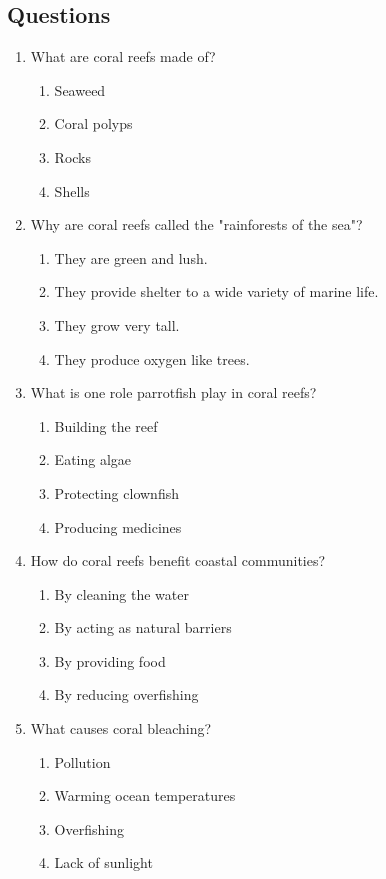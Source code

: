 \documentclass[12pt]{article}
\begin{document}
\subsection*{Questions}

\begin{enumerate}

\item What are coral reefs made of?
\begin{enumerate}[label=\Alph*.]
    \item Seaweed
    \item Coral polyps
    \item Rocks
    \item Shells
\end{enumerate}

\item Why are coral reefs called the "rainforests of the sea"?
\begin{enumerate}[label=\Alph*.]
    \item They are green and lush.
    \item They provide shelter to a wide variety of marine life.
    \item They grow very tall.
    \item They produce oxygen like trees.
\end{enumerate}

\item What is one role parrotfish play in coral reefs?
\begin{enumerate}[label=\Alph*.]
    \item Building the reef
    \item Eating algae
    \item Protecting clownfish
    \item Producing medicines
\end{enumerate}

\item How do coral reefs benefit coastal communities?
\begin{enumerate}[label=\Alph*.]
    \item By cleaning the water
    \item By acting as natural barriers
    \item By providing food
    \item By reducing overfishing
\end{enumerate}

\item What causes coral bleaching?
\begin{enumerate}[label=\Alph*.]
    \item Pollution
    \item Warming ocean temperatures
    \item Overfishing
    \item Lack of sunlight
\end{enumerate}


\end{enumerate}
\end{document}
